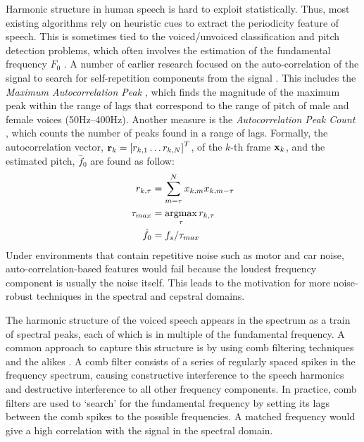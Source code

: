 Harmonic structure in human speech is hard to exploit statistically.
Thus, most existing algorithms rely on heuristic cues to extract the periodicity feature of speech.
This is sometimes tied to the voiced/unvoiced classification and pitch detection problems, which often involves the estimation of the fundamental frequency $F_0$ \cite{ishizuka2006study}.
A number of earlier research focused on the auto-correlation of the signal to search for self-repetition components from the signal \cite{rabiner1977use,kristjansson2005voicing}.
This includes the \emph{Maximum Autocorrelation Peak} \cite{kingsbury2002robust}, which finds the magnitude of the maximum peak within the range of lags that correspond to the range of pitch of male and female voices (50Hz--400Hz).
Another measure is the \emph{Autocorrelation Peak Count} \cite{basu2003linked}, which counts the number of peaks found in a range of lags.
Formally, the autocorrelation vector, $\mathbf{r}_k = \left[ r_{k,1} \dots r_{k,N} \right]^T$, of the $k$-th frame $\mathbf{x}_k$, and the estimated pitch, $\hat{f}_0$ are found as follow:
\begin{align}
    r_{k,\tau} &= \sum_{m=\tau}^N x_{k,m}x_{k,m-\tau} \\
    \tau_{max} &= \operatorname*{argmax}_{\tau} r_{k,\tau}      \\
    \hat{f}_0 &= f_s/\tau_{max}
\end{align}
Under environments that contain repetitive noise such as motor and car noise, auto-correlation-based features would fail because the loudest frequency component is usually the noise itself.
This leads to the motivation for more noise-robust techniques in the spectral and cepstral domains.


The harmonic structure of the voiced speech appears in the spectrum as a train of spectral peaks, each of which is in multiple of the fundamental frequency.
A common approach to capture this structure is by using comb filtering techniques \cite{tolba1998robust} and the alikes \cite{ishizuka2006study}.
A comb filter consists of a series of regularly spaced spikes in the frequency spectrum, causing constructive interference to the speech harmonics and destructive interference to all other frequency components.
In practice, comb filters are used to `search' for the fundamental frequency by setting its lags between the comb spikes to the possible frequencies.
A matched frequency would give a high correlation with the signal in the spectral domain.

